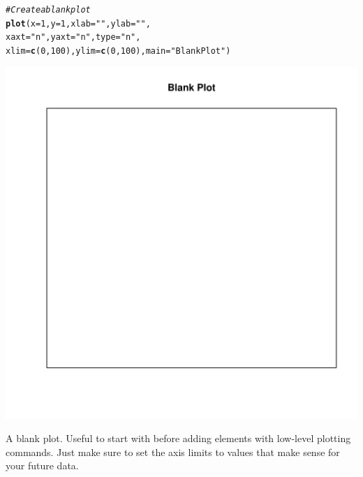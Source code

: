 \documentclass{tufte-book}\usepackage[]{graphicx}\usepackage[]{color}
\makeatletter
\def\maxwidth{ %
  \ifdim\Gin@nat@width>\linewidth
    \linewidth
  \else
    \Gin@nat@width
  \fi
}
\newcommand{\hlnum}[1]{\textcolor[rgb]{0.686,0.059,0.569}{#1}}%
\newcommand{\hlstr}[1]{\textcolor[rgb]{0.192,0.494,0.8}{#1}}%
\newcommand{\hlcom}[1]{\textcolor[rgb]{0.678,0.584,0.686}{\textit{#1}}}%
\newcommand{\hlstd}[1]{\textcolor[rgb]{0.345,0.345,0.345}{#1}}%
\newcommand{\hlkwc}[1]{\textcolor[rgb]{0.333,0.667,0.333}{#1}}%
\newcommand{\hlkwd}[1]{\textcolor[rgb]{0.737,0.353,0.396}{\textbf{#1}}}%
\newenvironment{kframe}{%
 \def\at@end@of@kframe{}%
 \ifinner\ifhmode%
  \def\at@end@of@kframe{\end{minipage}}%
  \begin{minipage}{\columnwidth}%
 \fi\fi%
 \def\FrameCommand##1{\hskip\@totalleftmargin \hskip-\fboxsep
 \colorbox{shadecolor}{##1}\hskip-\fboxsep
     \hskip-\linewidth \hskip-\@totalleftmargin \hskip\columnwidth}%
 \MakeFramed {\advance\hsize-\width
   \@totalleftmargin\z@ \linewidth\hsize
   \@setminipage}}%
 {\par\unskip\endMakeFramed%
 \at@end@of@kframe}
\newenvironment{knitrout}{}{} %
\makeatother
\begin{document}
\begin{footnotesize}
\begin{marginfigure}
\begin{tiny}
\begin{knitrout}
\color{fgcolor}\begin{kframe}
\begin{alltt}
\hlcom{# Create a blank plot}
\hlkwd{plot}\hlstd{(}\hlkwc{x} \hlstd{=} \hlnum{1}\hlstd{,} \hlkwc{y} \hlstd{=} \hlnum{1}\hlstd{,} \hlkwc{xlab} \hlstd{=} \hlstr{""}\hlstd{,} \hlkwc{ylab} \hlstd{=} \hlstr{""}\hlstd{,}
     \hlkwc{xaxt} \hlstd{=} \hlstr{"n"}\hlstd{,} \hlkwc{yaxt} \hlstd{=} \hlstr{"n"}\hlstd{,} \hlkwc{type} \hlstd{=} \hlstr{"n"}\hlstd{,}
     \hlkwc{xlim} \hlstd{=} \hlkwd{c}\hlstd{(}\hlnum{0}\hlstd{,} \hlnum{100}\hlstd{),} \hlkwc{ylim} \hlstd{=} \hlkwd{c}\hlstd{(}\hlnum{0}\hlstd{,} \hlnum{100}\hlstd{),} \hlkwc{main} \hlstd{=} \hlstr{"Blank Plot"}\hlstd{)}
\end{alltt}
\end{kframe}
\includegraphics[width=\maxwidth]{figure/unnamed-chunk-146-1} 

\end{knitrout}
\end{tiny}
\caption{A blank plot. Useful to start with before adding elements with low-level plotting commands. Just make sure to set the axis limits to values that make sense for your future data.}
\label{fig:blankplot}
\end{marginfigure}


\end{footnotesize}
\end{document}

